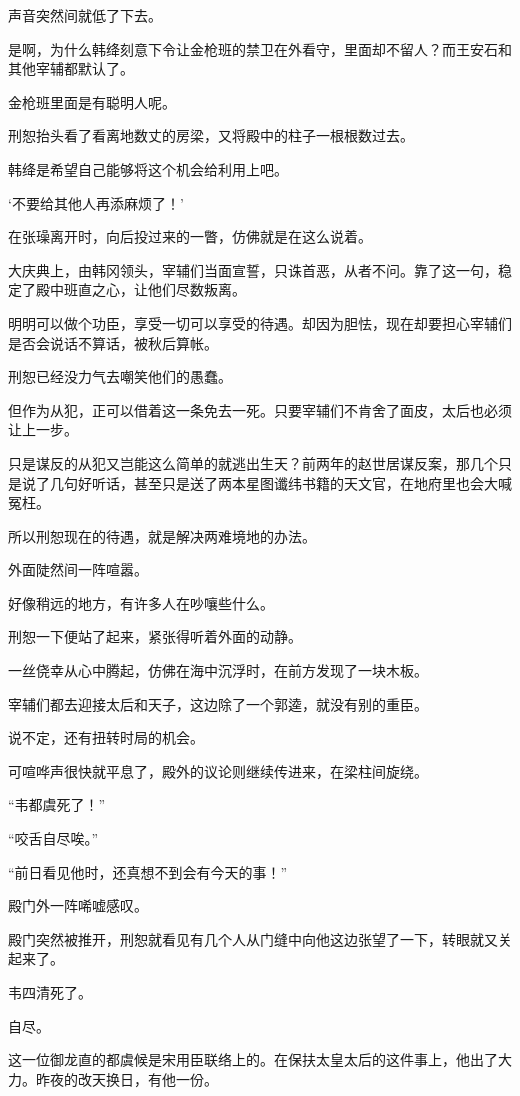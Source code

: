声音突然间就低了下去。

是啊，为什么韩绛刻意下令让金枪班的禁卫在外看守，里面却不留人？而王安石和其他宰辅都默认了。

金枪班里面是有聪明人呢。

刑恕抬头看了看离地数丈的房梁，又将殿中的柱子一根根数过去。

韩绛是希望自己能够将这个机会给利用上吧。

‘不要给其他人再添麻烦了！’

在张璪离开时，向后投过来的一瞥，仿佛就是在这么说着。

大庆典上，由韩冈领头，宰辅们当面宣誓，只诛首恶，从者不问。靠了这一句，稳定了殿中班直之心，让他们尽数叛离。

明明可以做个功臣，享受一切可以享受的待遇。却因为胆怯，现在却要担心宰辅们是否会说话不算话，被秋后算帐。

刑恕已经没力气去嘲笑他们的愚蠢。

但作为从犯，正可以借着这一条免去一死。只要宰辅们不肯舍了面皮，太后也必须让上一步。

只是谋反的从犯又岂能这么简单的就逃出生天？前两年的赵世居谋反案，那几个只是说了几句好听话，甚至只是送了两本星图谶纬书籍的天文官，在地府里也会大喊冤枉。

所以刑恕现在的待遇，就是解决两难境地的办法。

外面陡然间一阵喧嚣。

好像稍远的地方，有许多人在吵嚷些什么。

刑恕一下便站了起来，紧张得听着外面的动静。

一丝侥幸从心中腾起，仿佛在海中沉浮时，在前方发现了一块木板。

宰辅们都去迎接太后和天子，这边除了一个郭逵，就没有别的重臣。

说不定，还有扭转时局的机会。

可喧哗声很快就平息了，殿外的议论则继续传进来，在梁柱间旋绕。

“韦都虞死了！”

“咬舌自尽唉。”

“前日看见他时，还真想不到会有今天的事！”

殿门外一阵唏嘘感叹。

殿门突然被推开，刑恕就看见有几个人从门缝中向他这边张望了一下，转眼就又关起来了。

韦四清死了。

自尽。

这一位御龙直的都虞候是宋用臣联络上的。在保扶太皇太后的这件事上，他出了大力。昨夜的改天换日，有他一份。

